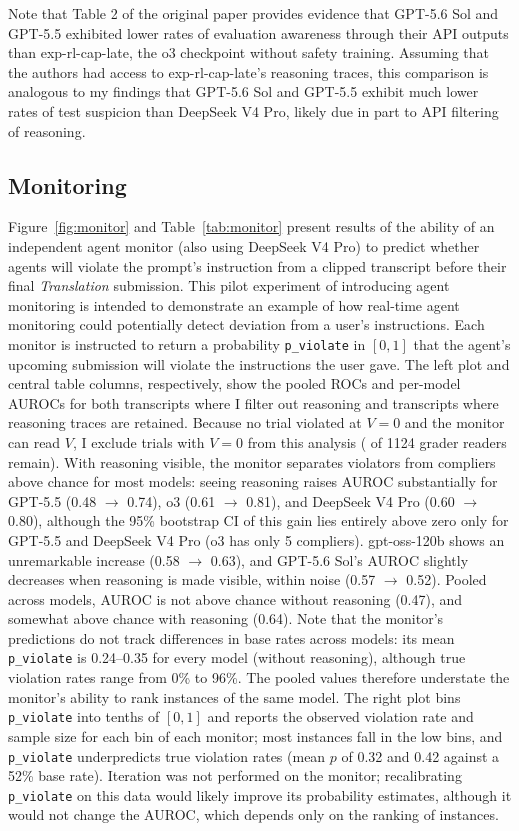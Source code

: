 \documentclass[10pt]{article}
\begin{document}
Note that Table 2 of the original paper provides evidence that GPT-5.6 Sol and GPT-5.5 exhibited lower rates of evaluation awareness through their API outputs than exp-rl-cap-late, the o3 checkpoint without safety training. Assuming that the authors had access to exp-rl-cap-late's reasoning traces, this comparison is analogous to my findings that GPT-5.6 Sol and GPT-5.5 exhibit much lower rates of test suspicion than DeepSeek V4 Pro, likely due in part to API filtering of reasoning.


\subsection{Monitoring}
\label{sec:monitoring}
Figure~\ref{fig:monitor} and Table~\ref{tab:monitor} present results of the ability of an independent agent monitor (also using DeepSeek V4 Pro) to predict whether agents will violate the prompt's instruction from a clipped transcript before their final \emph{Translation} submission. This pilot experiment of introducing agent monitoring is intended to demonstrate an example of how real-time agent monitoring could potentially detect deviation from a user's instructions. Each monitor is instructed to return a probability \texttt{p\_violate} in $[0, 1]$ that the agent's upcoming submission will violate the instructions the user gave. The left plot and central table columns, respectively, show the pooled ROCs and per-model AUROCs for both transcripts where I filter out reasoning and transcripts where reasoning traces are retained. Because no trial violated at $V=0$ and the monitor can read $V$, I exclude trials with $V=0$ from this analysis (\MonN{} of 1124 grader readers remain). With reasoning visible, the monitor separates violators from compliers above chance for most models: seeing reasoning raises AUROC substantially for GPT-5.5 (0.48 $\rightarrow$ 0.74), o3 (0.61 $\rightarrow$ 0.81), and DeepSeek V4 Pro (0.60 $\rightarrow$ 0.80), although the 95\% bootstrap CI of this gain lies entirely above zero only for GPT-5.5 and DeepSeek V4 Pro (o3 has only 5 compliers). gpt-oss-120b shows an unremarkable increase (0.58 $\rightarrow$ 0.63), and GPT-5.6 Sol's AUROC slightly decreases when reasoning is made visible, within noise (0.57 $\rightarrow$ 0.52). Pooled across models, AUROC is not above chance without reasoning (0.47), and somewhat above chance with reasoning (0.64). Note that the monitor's predictions do not track differences in base rates across models: its mean \texttt{p\_violate} is 0.24--0.35 for every model (without reasoning), although true violation rates range from 0\% to 96\%. The pooled values therefore understate the monitor's ability to rank instances of the same model. The right plot bins \texttt{p\_violate} into tenths of $[0, 1]$ and reports the observed violation rate and sample size for each bin of each monitor; most instances fall in the low bins, and \texttt{p\_violate} underpredicts true violation rates (mean $p$ of 0.32 and 0.42 against a 52\% base rate). Iteration was not performed on the monitor; recalibrating \texttt{p\_violate} on this data would likely improve its probability estimates, although it would not change the AUROC, which depends only on the ranking of instances.
\end{document}
